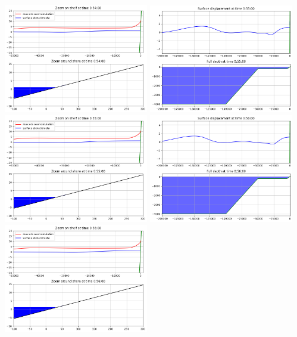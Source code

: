 \documentclass[11pt]{article}
\begin{document}
\includegraphics[width=0.475\textwidth]{frame0054fig1.png}
\vskip 10pt 
\includegraphics[width=0.475\textwidth]{frame0055fig0.png}
\includegraphics[width=0.475\textwidth]{frame0055fig1.png}
\vskip 10pt 
\includegraphics[width=0.475\textwidth]{frame0056fig0.png}
\includegraphics[width=0.475\textwidth]{frame0056fig1.png}
\end{document}
